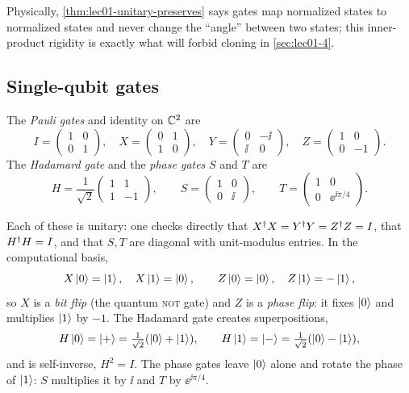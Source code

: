Physically, \cref{thm:lec01-unitary-preserves} says gates map normalized states to
normalized states and never change the ``angle'' between two states; this
inner-product rigidity is exactly what will forbid cloning in \cref{sec:lec01-4}.

\subsection{Single-qubit gates}

\begin{definition}\label{def:lec01-gates}
The \emph{Pauli gates} and identity on $\mathbb{C}^{2}$ are
\[
  I=\begin{pmatrix}1&0\\0&1\end{pmatrix},\quad
  X=\begin{pmatrix}0&1\\1&0\end{pmatrix},\quad
  Y=\begin{pmatrix}0&-\ii\\\ii&0\end{pmatrix},\quad
  Z=\begin{pmatrix}1&0\\0&-1\end{pmatrix}.
\]
The \emph{Hadamard gate} and the \emph{phase gates} $S$ and $T$ are
\[
  H=\frac{1}{\sqrt{2}}\begin{pmatrix}1&1\\1&-1\end{pmatrix},\qquad
  S=\begin{pmatrix}1&0\\0&\ii\end{pmatrix},\qquad
  T=\begin{pmatrix}1&0\\0&\ee^{\ii\pi/4}\end{pmatrix}.
\]
\end{definition}

Each of these is unitary: one checks directly that $X^{\dagger} X=Y^{\dagger} Y=Z^{\dagger} Z=I$, that
$H^{\dagger} H=I$, and that $S,T$ are diagonal with unit-modulus entries. In the
computational basis,
\[
  X\ket{0}=\ket{1},\quad X\ket{1}=\ket{0},\qquad
  Z\ket{0}=\ket{0},\quad Z\ket{1}=-\ket{1},
\]
so $X$ is a \emph{bit flip} (the quantum \textsc{not} gate) and $Z$ is a
\emph{phase flip}: it fixes $\ket{0}$ and multiplies $\ket{1}$ by $-1$. The Hadamard
gate creates superpositions,
\[
  H\ket{0}=\ket{+}=\tfrac{1}{\sqrt{2}}(\ket{0}+\ket{1}),\qquad
  H\ket{1}=\ket{-}=\tfrac{1}{\sqrt{2}}(\ket{0}-\ket{1}),
\]
and is self-inverse, $H^{2}=I$. The phase gates leave $\ket{0}$ alone and rotate the
phase of $\ket{1}$: $S$ multiplies it by $\ii$ and $T$ by $\ee^{\ii\pi/4}$.

